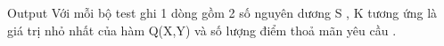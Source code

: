 Output
Với mỗi bộ test ghi 1 dòng gồm 2 số nguyên dương S , K tương ứng là giá trị nhỏ nhất của hàm Q(X,Y) và số lượng điểm thoả mãn yêu cầu .